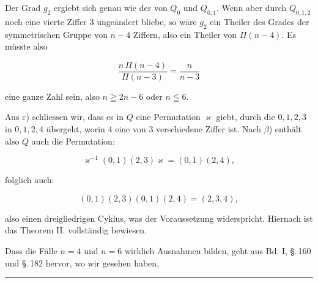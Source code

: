 Der Grad $g_2$ ergiebt sich genau wie der von $Q_0$ und $Q_{0,1}$. Wenn aber
durch $Q_{0,1,2}$ noch eine vierte Ziffer 3 ungeändert bliebe, so wäre $g_2$ ein
Theiler des Grades der symmetrischen Gruppe von $n-4$ Ziffern, also ein Theiler
von $\Pi(n-4)$. Es müsste also

\[ \frac{n\,\Pi(n-4)}{\Pi(n-3)} = \frac{n}{n-3} \]

eine ganze Zahl sein, also $n \geqq 2n - 6$ oder $n \leqq 6$.

Aus $\varepsilon$) schliessen wir, dass es in $Q$ eine Permutation $\varkappa$
giebt, durch die $0, 1, 2, 3$ in $0, 1, 2, 4$ übergeht, worin 4 eine von 3
verschiedene Ziffer ist. Nach $\beta$) enthält also $Q$ auch die Permutation:

\[ \varkappa^{-1}(0,1)(2,3)\varkappa = (0,1)(2,4), \]

folglich auch:

\[ (0,1)(2,3)(0,1)(2,4) = (2,3,4), \]

also einen dreigliedrigen Cyklus, was der Voraussetzung widerspricht. Hiernach
ist das Theorem II. vollständig bewiesen.

Dass die Fälle $n = 4$ und $n = 6$ wirklich Ausnahmen bilden, geht aus Bd. I,
\S.\,160 und \S.\,182 hervor, wo wir gesehen haben, 

\begin{center}
\rule{3cm}{0.4pt}
\end{center}
